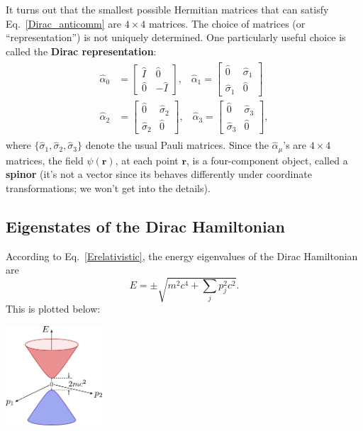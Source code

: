 \documentclass[prx,12pt]{revtex4-2}
\begin{document}
It turns out that the smallest possible Hermitian matrices that can
satisfy Eq.~\eqref{Dirac_anticomm} are $4\times4$ matrices.  The
choice of matrices (or ``representation'') is not uniquely determined.
One particularly useful choice is called the \textbf{Dirac
  representation}:
\begin{align}
  \begin{aligned}
    \hat{\alpha}_0 &= \begin{bmatrix}
      \hat{I}\, & \hat{0} \\ \hat{0} & -\hat{I}
    \end{bmatrix}, \;\;\;
    \hat{\alpha}_1 = \begin{bmatrix}
      \hat{0} & \hat{\sigma}_1 \\ \hat{\sigma}_1 & \hat{0}
    \end{bmatrix} \\
    \hat{\alpha}_2 &= \begin{bmatrix}
      \hat{0} & \hat{\sigma}_2 \\ \hat{\sigma}_2 & \hat{0}
    \end{bmatrix}, \;\;\;
    \hat{\alpha}_3 = \begin{bmatrix}
      \hat{0} & \hat{\sigma}_3 \\ \hat{\sigma}_3 & \hat{0}
    \end{bmatrix},
  \end{aligned}
  \label{alpha_matrices}
\end{align}
where $\{\hat{\sigma}_{1}, \hat{\sigma}_{2}, \hat{\sigma}_{3}\}$
denote the usual Pauli matrices.  Since the $\hat{\alpha}_\mu$'s are
$4\times4$ matrices, the field $\psi(\mathbf{r})$, at each point
$\mathbf{r}$, is a four-component object, called a \textbf{spinor}
(it's not a vector since its behaves differently under coordinate
transformations; we won't get into the details).

\subsection{Eigenstates of the Dirac Hamiltonian}
\label{sec:deigenstates}

According to Eq.~\eqref{Erelativistic}, the energy eigenvalues of the
Dirac Hamiltonian are
\begin{equation}
  E = \pm \sqrt{m^2c^4 + \sum_{j} p_j^2c^2}.
  \label{Edispdirac}
\end{equation}
This is plotted below:

\begin{center}
  \includegraphics[width=0.27\textwidth]{diraccone}
\end{center}
\end{document}
